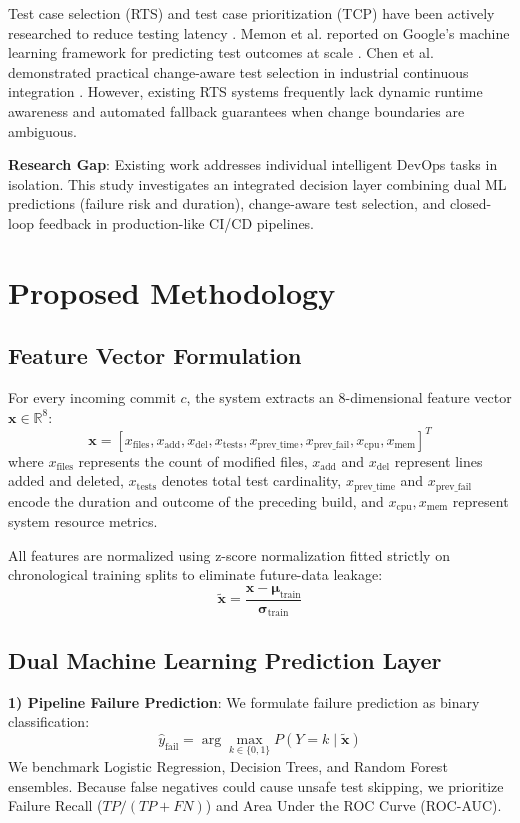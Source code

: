 \documentclass[conference]{IEEEtran}
\begin{document}
Test case selection (RTS) and test case prioritization (TCP) have been actively researched to reduce testing latency \cite{elbaum2014techniques, marijan2013titan}. Memon et al. reported on Google's machine learning framework for predicting test outcomes at scale \cite{memon2017taming}. Chen et al. demonstrated practical change-aware test selection in industrial continuous integration \cite{chen2020practical}. However, existing RTS systems frequently lack dynamic runtime awareness and automated fallback guarantees when change boundaries are ambiguous.

\textbf{Research Gap}: Existing work addresses individual intelligent DevOps tasks in isolation. This study investigates an integrated decision layer combining dual ML predictions (failure risk and duration), change-aware test selection, and closed-loop feedback in production-like CI/CD pipelines.

\section{Proposed Methodology}
\subsection{Feature Vector Formulation}
For every incoming commit $c$, the system extracts an 8-dimensional feature vector $\mathbf{x} \in \mathbb{R}^8$:
\begin{equation}
\mathbf{x} = [x_{\text{files}}, x_{\text{add}}, x_{\text{del}}, x_{\text{tests}}, x_{\text{prev\_time}}, x_{\text{prev\_fail}}, x_{\text{cpu}}, x_{\text{mem}}]^T
\end{equation}
where $x_{\text{files}}$ represents the count of modified files, $x_{\text{add}}$ and $x_{\text{del}}$ represent lines added and deleted, $x_{\text{tests}}$ denotes total test cardinality, $x_{\text{prev\_time}}$ and $x_{\text{prev\_fail}}$ encode the duration and outcome of the preceding build, and $x_{\text{cpu}}, x_{\text{mem}}$ represent system resource metrics.

All features are normalized using z-score normalization fitted strictly on chronological training splits to eliminate future-data leakage:
\begin{equation}
\tilde{\mathbf{x}} = \frac{\mathbf{x} - \boldsymbol{\mu}_{\text{train}}}{\boldsymbol{\sigma}_{\text{train}}}
\end{equation}

\subsection{Dual Machine Learning Prediction Layer}
\textbf{1) Pipeline Failure Prediction}: We formulate failure prediction as binary classification:
\begin{equation}
\hat{y}_{\text{fail}} = \arg\max_{k \in \{0, 1\}} P(Y = k \mid \tilde{\mathbf{x}})
\end{equation}
We benchmark Logistic Regression, Decision Trees, and Random Forest ensembles. Because false negatives could cause unsafe test skipping, we prioritize Failure Recall ($TP / (TP + FN)$) and Area Under the ROC Curve (ROC-AUC).
\end{document}
